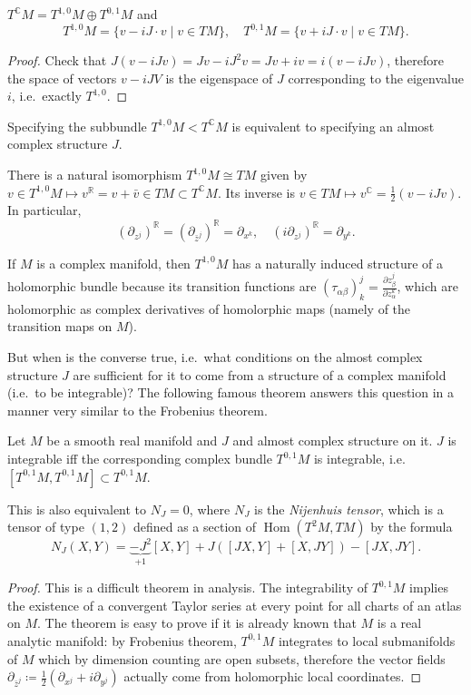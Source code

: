 \documentclass[english,letterpaper]{article}%
\numberwithin{equation}{section}
\numberwithin{figure}{section}
\numberwithin{table}{section}
\theoremstyle{definition}
\theoremstyle{definition}
\theoremstyle{definition}
\theoremstyle{plain}
\theoremstyle{plain}
\theoremstyle{plain}
\theoremstyle{plain}
\theoremstyle{remark}
\theoremstyle{remark}
\DeclareMathOperator{\Hom}{Hom}
\begin{document}
\begin{prop}
    $T^\mathbb{C}M=T^{1,0}M\oplus T^{0,1}M$ and 
    \[T^{1,0}M=\{v-iJ\cdot v\mid v\in TM \}, \quad T^{0,1}M=\{v+iJ\cdot v\mid v\in TM \}.\]
\end{prop}
\begin{proof}
    Check that $J(v-iJv)=Jv-iJ^2v=Jv+iv=i(v-iJv)$, therefore the space of vectors $v-iJV$ is the eigenspace of $J$ corresponding to the eigenvalue $i$, i.e.\ exactly $T^{1,0}$.
\end{proof}

Specifying the subbundle $T^{1,0}M<T^\mathbb{C}M$ is equivalent to specifying an almost complex structure $J$.

There is a natural isomorphism $T^{1,0}M\cong TM$ given by $v\in T^{1,0}M\mapsto v^\mathbb{R}=v+\bar v\in TM\subset T^\mathbb{C} M$. Its inverse is $v\in TM\mapsto v^\mathbb{C}=\frac12(v-iJv)$. In particular,
\[(\partial_{z^j})^\mathbb{R}=(\partial_{\bar z^j})^\mathbb{R}=\partial_{x^k},\quad (i\partial_{z^j})^\mathbb{R}=\partial_{y^k}.\]

If $M$ is a complex manifold, then $T^{1,0}M$ has a naturally induced structure of a holomorphic bundle because its transition functions are $(\tau_{\alpha\beta})^j_k=\frac{\partial z_\beta^j}{\partial z_\alpha^k}$, which are holomorphic as complex derivatives of homolorphic maps (namely of the transition maps on $M$).

But when is the converse true, i.e.\ what conditions on the almost complex structure $J$ are sufficient for it to come from a structure of a complex manifold (i.e.\ to be integrable)? The following famous theorem answers this question in a manner very similar to the Frobenius theorem.

\begin{thm}
    Let $M$ be a smooth real manifold and $J$ and almost complex structure on it. $J$ is integrable iff the corresponding complex bundle $T^{0,1}M$ is integrable, i.e.\ $[T^{0,1}M,T^{0,1}M]\subset T^{0,1}M$.
    
    This is also equivalent to $N_J=0$, where $N_J$ is the \emph{Nijenhuis tensor}, which is a tensor of type $(1,2)$ defined as a section of $\Hom(T^2M,TM)$ by the formula
    \[N_J(X,Y)=\underbrace{-J^2}_{+1}[X,Y]+J([JX,Y]+[X,JY])-[JX,JY].\]
\end{thm}
\begin{proof}
    This is a difficult theorem in analysis. The integrability of $T^{0,1}M$ implies the existence of a convergent Taylor series at every point for all charts of an atlas on $M$. The theorem is easy to prove if it is already known that $M$ is a real analytic manifold: by Frobenius theorem, $T^{0,1}M$ integrates to local submanifolds of $M$ which by dimension counting are open subsets, therefore the vector fields $\partial_{\bar z^j}\coloneqq\frac12(\partial_{x^j}+i\partial_{y^j})$ actually come from holomorphic local coordinates.
\end{proof}
\end{document}
